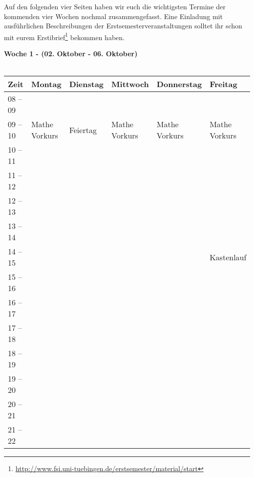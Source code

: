 Auf den folgenden vier Seiten haben wir euch die wichtigsten Termine der kommenden vier Wochen nochmal zusammengefasst. Eine Einladung mit ausführlichen Beschreibungen der Erstsemesterveranstaltungen solltet ihr schon mit eurem Erstibrief\footnote{\url{http://www.fsi.uni-tuebingen.de/erstsemester/material/start}} bekommen haben.
\vfill




\textbf{Woche 1 - (02. Oktober - 06. Oktober)}\\
\\
\begin{tabular}{|l|p{}|p{}|p{}|p{}|p{}|} \hline
 Zeit & Montag & Dienstag & Mittwoch & Donnerstag & Freitag \\ 
 \hline \hline
 08 -- 09 & & & & & \\ \cline{1-1} 
\cline{2-6}
 09 -- 10 &\footnotesize{Mathe Vorkurs} & \footnotesize{Feiertag} &\footnotesize{Mathe Vorkurs} & \footnotesize{Mathe Vorkurs} & \footnotesize{Mathe Vorkurs} \\ \cline{1-1}
 10 -- 11 & & & & & \\ \cline{1-1}
 11 -- 12 & & & & & \\ \cline{1-1}
 12 -- 13 & & & & & \\ \cline{1-1} 
 13 -- 14 & & & & & \\ \cline{1-1} \cline{6-6}
 14 -- 15 & & & & & \cellcolor{lightlightgray} \footnotesize{Kastenlauf}\\ \cline{1-1}
 15 -- 16 & & & & & \ \cellcolor{lightlightgray} \\ \cline{1-5}
 16 -- 17 & & & & &  \cellcolor{lightlightgray}\\ \cline{1-1}
 17 -- 18 & & & & & \cellcolor{lightlightgray}\\ \cline{1-1} \cline{6-6}	
 18 -- 19 & & & & & \\ \cline{1-1}
 19 -- 20 & & & & &   \\ \cline{1-1}
 20 -- 21 & & & &  &  \\ \cline{1-1}
 21 -- 22 & & & & & \\ \hline
 \end{tabular}
\vfil

